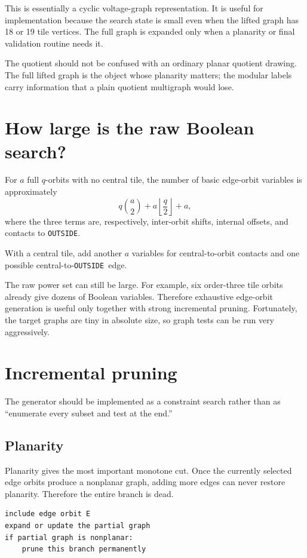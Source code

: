 \documentclass[11pt]{article}
\newcommand{\OUT}{\texttt{OUTSIDE}}
\begin{document}
This is essentially a cyclic voltage-graph representation. It is useful for implementation because the search state is small even when the lifted graph has 18 or 19 tile vertices. The full graph is expanded only when a planarity or final validation routine needs it.

The quotient should not be confused with an ordinary planar quotient drawing. The full lifted graph is the object whose planarity matters; the modular labels carry information that a plain quotient multigraph would lose.

\section{How large is the raw Boolean search?}

For \(a\) full \(q\)-orbits with no central tile, the number of basic edge-orbit variables is approximately
\[
q\binom a2 + a\left\lfloor\frac q2\right\rfloor + a,
\]
where the three terms are, respectively, inter-orbit shifts, internal offsets, and contacts to \OUT.

With a central tile, add another \(a\) variables for central-to-orbit contacts and one possible central-to-\OUT\ edge.

The raw power set can still be large. For example, six order-three tile orbits already give dozens of Boolean variables. Therefore exhaustive edge-orbit generation is useful only together with strong incremental pruning. Fortunately, the target graphs are tiny in absolute size, so graph tests can be run very aggressively.

\section{Incremental pruning}

The generator should be implemented as a constraint search rather than as ``enumerate every subset and test at the end.''

\subsection{Planarity}

Planarity gives the most important monotone cut. Once the currently selected edge orbits produce a nonplanar graph, adding more edges can never restore planarity. Therefore the entire branch is dead.

\begin{lstlisting}
include edge orbit E
expand or update the partial graph
if partial graph is nonplanar:
    prune this branch permanently
\end{lstlisting}
\end{document}
